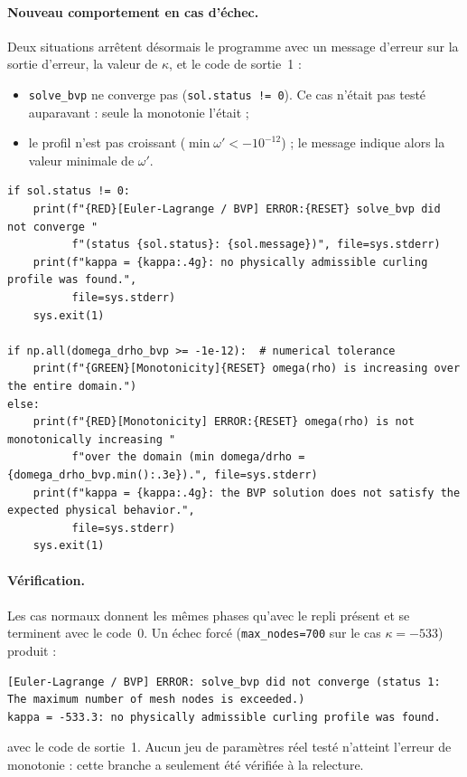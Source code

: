 \documentclass[11pt,a4paper]{article}
\begin{document}
\paragraph{Nouveau comportement en cas d'échec.}
Deux situations arrêtent désormais le programme avec un message d'erreur
sur la sortie d'erreur, la valeur de $\kappa$, et le code de sortie~1 :
\begin{itemize}
  \item \texttt{solve\_bvp} ne converge pas (\texttt{sol.status != 0}). Ce
        cas n'était pas testé auparavant : seule la monotonie l'était ;
  \item le profil n'est pas croissant ($\min\omega' < -10^{-12}$) ; le
        message indique alors la valeur minimale de $\omega'$.
\end{itemize}

\begin{lstlisting}
if sol.status != 0:
    print(f"{RED}[Euler-Lagrange / BVP] ERROR:{RESET} solve_bvp did not converge "
          f"(status {sol.status}: {sol.message})", file=sys.stderr)
    print(f"kappa = {kappa:.4g}: no physically admissible curling profile was found.",
          file=sys.stderr)
    sys.exit(1)

if np.all(domega_drho_bvp >= -1e-12):  # numerical tolerance
    print(f"{GREEN}[Monotonicity]{RESET} omega(rho) is increasing over the entire domain.")
else:
    print(f"{RED}[Monotonicity] ERROR:{RESET} omega(rho) is not monotonically increasing "
          f"over the domain (min domega/drho = {domega_drho_bvp.min():.3e}).", file=sys.stderr)
    print(f"kappa = {kappa:.4g}: the BVP solution does not satisfy the expected physical behavior.",
          file=sys.stderr)
    sys.exit(1)
\end{lstlisting}

\paragraph{Vérification.}
Les cas normaux donnent les mêmes phases qu'avec le repli présent et se
terminent avec le code~0. Un échec forcé (\texttt{max\_nodes=700} sur le cas
$\kappa=-533$) produit :
\begin{lstlisting}[language={}]
[Euler-Lagrange / BVP] ERROR: solve_bvp did not converge (status 1: The maximum number of mesh nodes is exceeded.)
kappa = -533.3: no physically admissible curling profile was found.
\end{lstlisting}
avec le code de sortie~1. Aucun jeu de paramètres réel testé n'atteint
l'erreur de monotonie : cette branche a seulement été vérifiée à la relecture.
\end{document}
